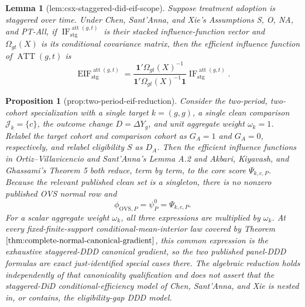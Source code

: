 \documentclass{article}
\newtheorem{lemma}{Lemma}
\newtheorem{proposition}{Proposition}
\begin{document}
\begin{lemma}[lem:csx-staggered-did-eif-scope]\label{lem:csx-staggered-did-eif-scope}
Suppose treatment adoption is staggered over time. Under Chen, Sant'Anna, and Xie's Assumptions S, O, NA, and PT-All, if \(\operatorname{IF}^{\operatorname{att}(g,t)}_{\mathrm{stg}}\) is their stacked influence-function vector and \(\Omega_{gt}(X)\) is its conditional covariance matrix, then the efficient influence function of \(\operatorname{ATT}(g,t)\) is
\[
\operatorname{EIF}^{\operatorname{att}(g,t)}_{\mathrm{stg}}
=\frac{\mathbf 1'\Omega_{gt}(X)^{-1}}{\mathbf 1'\Omega_{gt}(X)^{-1}\mathbf 1}
\operatorname{IF}^{\operatorname{att}(g,t)}_{\mathrm{stg}}.
\]
\end{lemma}

\begin{proposition}[prop:two-period-eif-reduction]\label{prop:two-period-eif-reduction}
Consider the two-period, two-cohort specialization with a single target \(k=(g,g)\), a single clean comparison \(\mathcal J_k=\{c\}\), the outcome change \(D=\Delta Y_g\), and unit aggregate weight \(\omega_k=1\). Relabel the target cohort and comparison cohort as \(G_A=1\) and \(G_A=0\), respectively, and relabel eligibility \(S\) as \(D_A\). Then the efficient influence functions in Ortiz--Villavicencio and Sant'Anna's Lemma A.2 and Akbari, Kiyavash, and Ghassami's Theorem 5 both reduce, term by term, to the core score \(\Psi_{k,c,P}\). Because the relevant published clean set is a singleton, there is no nonzero published OVS normal row and \[\phi_{\mathrm{OVS},P}=\psi_P^0=\Psi_{k,c,P}.\] For a scalar aggregate weight \(\omega_k\), all three expressions are multiplied by \(\omega_k\). At every fixed-finite-support conditional-mean-interior law covered by Theorem \(\ref{thm:complete-normal-canonical-gradient}\), this common expression is the exhaustive staggered-DDD canonical gradient, so the two published panel-DDD formulas are exact just-identified special cases there. The algebraic reduction holds independently of that canonicality qualification and does not assert that the staggered-DiD conditional-efficiency model of Chen, Sant'Anna, and Xie is nested in, or contains, the eligibility-gap DDD model.
\end{proposition}
\end{document}
